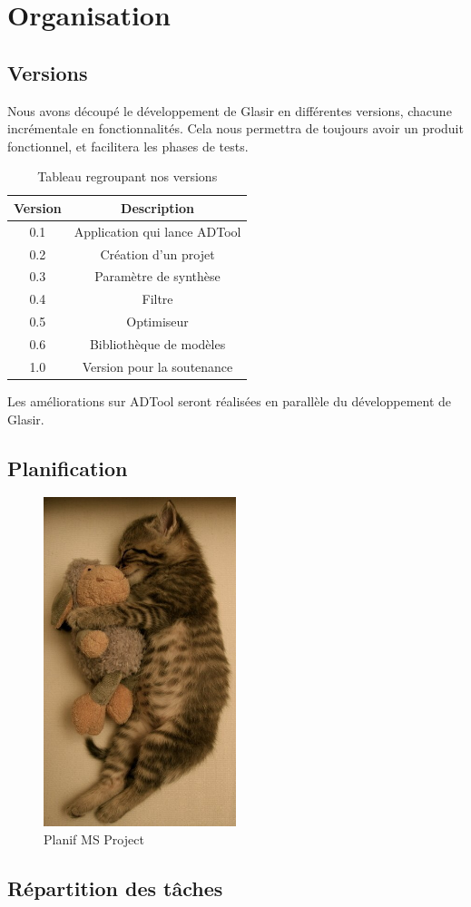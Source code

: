 \section{Organisation}
	\subsection{Versions}
		Nous avons découpé le développement de Glasir en différentes versions, chacune incrémentale en fonctionnalités.
		Cela nous permettra de toujours avoir un produit fonctionnel, et facilitera les phases de tests.

		\begin{table}[h!]
			\begin{center}
			\begin{tabular}{|c|c|}
				\hline
				Version & Description\\
				\hline
				0.1 & Application qui lance ADTool\\
				\hline
				0.2 & Création d'un projet\\
				\hline
				0.3 & Paramètre de synthèse\\
				\hline
				0.4 & Filtre\\
				\hline
				0.5 & Optimiseur\\
				\hline
				0.6 & Bibliothèque de modèles\\
				\hline
				1.0 & Version pour la soutenance\\
				\hline
			\end{tabular}
			\end{center}
			\caption{Tableau regroupant nos versions}
		\end{table}

		Les améliorations sur ADTool seront réalisées en parallèle du développement de Glasir.

	\subsection{Planification}
		\begin{figure}
			\begin{center}
				\includegraphics[width=0.5\textwidth]{figure/planif.jpg}
			\end{center}
			\caption{Planif MS Project}
			\label{fig:planif}
		\end{figure}


	\subsection{Répartition des tâches}
